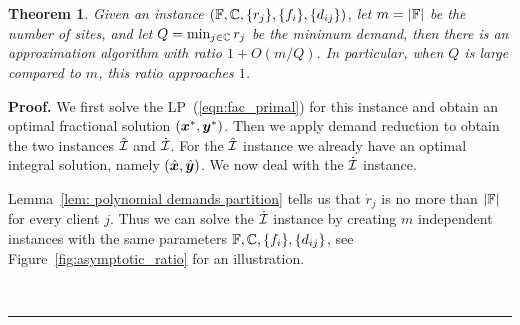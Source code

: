 \documentclass[oneside,final]{ucr}
\newtheorem{theorem}{Theorem}
\newenvironment{proof}[1][Proof]{\textbf{#1.} }{\ \rule{0.5em}{0.5em}}
\def\ssp{\def\baselinestretch{1.0}\large\normalsize}
\begin{document}
\begin{theorem}
  \label{thm:largeR}
  Given an {\FTFP} instance $(\mathbb{F}, \mathbb{C}, \{r_j\}
  , \{f_i\}, \{d_{ij}\})$, let $m = |\mathbb{F}|$ be the
  number of sites, and let $Q = \min_{j\in\mathbb{C}} r_j$
  be the minimum demand, then there is an approximation
  algorithm with ratio $1 + O(m/Q)$. In particular, when $Q$
  is large compared to $m$, this ratio approaches $1$.
\end{theorem}
\begin{proof}
  We first solve the LP~(\ref{eqn:fac_primal}) for this
  instance and obtain an optimal fractional solution
  $(\boldsymbol{x}^\ast, \boldsymbol{y}^\ast)$. Then we apply demand reduction
  to obtain the two instances $\hat {\mathcal{I}}$ and $\dot
  {\mathcal{I}}$. For the $\hat {\mathcal{I}}$ instance we already have an
  optimal integral solution, namely
  $(\hat{\boldsymbol{x}},\hat{\boldsymbol{y}})$. We now deal with the $\dot{\mathcal{I}}$
  instance.

  Lemma~\ref{lem: polynomial demands partition} tells us
  that $\dot r_j$ is no more than $|\mathbb{F}|$ for every
  client $j$. Thus we can solve the $\dot {\mathcal{I}}$ instance by
  creating $m$ independent {\UFL} instances with the same
  parameters $\mathbb{F}, \mathbb{C}, \{f_i\}, \{d_{ij}\}$,
  see Figure~\ref{fig:asymptotic_ratio} for an
  illustration.
  \ssp
  \begin{figure}[ht]
    \centering
\end{figure}
\end{proof}
\end{document}

